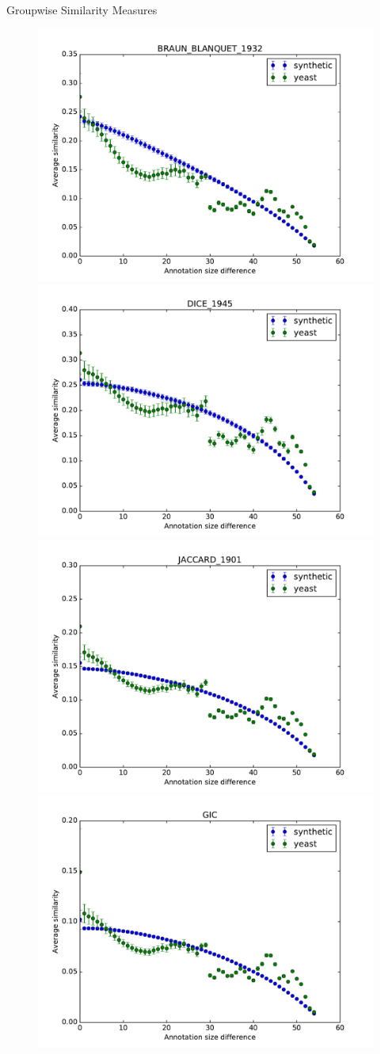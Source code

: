 \documentclass{beamer}
\begin{document}
\begin{frame}{Groupwise Similarity Measures}
\begin{figure}
\includegraphics[width=0.5\linewidth, height=0.4\textheight]{groupwise_diff/SIM_FRAMEWORK_DAG_SET_BRAUN_BLANQUET_1932_diff.pdf}
\includegraphics[width=0.5\linewidth, height=0.4\textheight]{groupwise_diff/SIM_FRAMEWORK_DAG_SET_DICE_1945_diff.pdf} \\
\includegraphics[width=0.5\linewidth, height=0.4\textheight]{groupwise_diff/SIM_FRAMEWORK_DAG_SET_JACCARD_1901_diff.pdf}
\includegraphics[width=0.5\linewidth, height=0.4\textheight]{groupwise_diff/SIM_GROUPWISE_DAG_GIC_diff.pdf}
\end{figure}
\end{frame}
\end{document}

